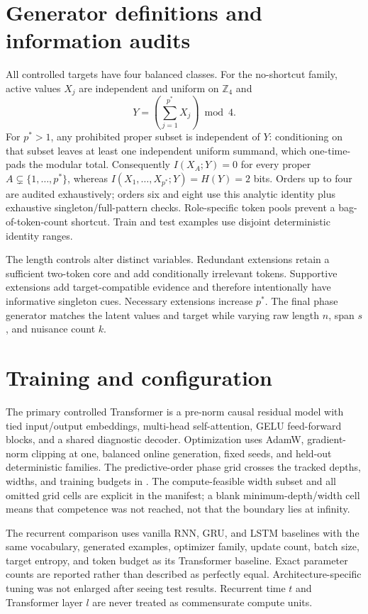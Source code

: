 \section{Generator definitions and information audits}
All controlled targets have four balanced classes.  For the no-shortcut family, active values $X_j$ are independent and uniform on $\mathbb Z_4$ and
\[
Y=\left(\sum_{j=1}^{p^*}X_j\right)\bmod 4.
\]
For $p^*>1$, any prohibited proper subset is independent of $Y$: conditioning on that subset leaves at least one independent uniform summand, which one-time-pads the modular total.  Consequently $I(X_A;Y)=0$ for every proper $A\subsetneq\{1,\ldots,p^*\}$, whereas $I(X_1,\ldots,X_{p^*};Y)=H(Y)=2$ bits.  Orders up to four are audited exhaustively; orders six and eight use this analytic identity plus exhaustive singleton/full-pattern checks.  Role-specific token pools prevent a bag-of-token-count shortcut.  Train and test examples use disjoint deterministic identity ranges.

The length controls alter distinct variables.  Redundant extensions retain a sufficient two-token core and add conditionally irrelevant tokens.  Supportive extensions add target-compatible evidence and therefore intentionally have informative singleton cues.  Necessary extensions increase $p^*$.  The final phase generator matches the latent values and target while varying raw length $n$, span $s$, and nuisance count $k$.

\section{Training and configuration}
\begingroup\raggedright
The primary controlled Transformer is a pre-norm causal residual model with tied input/output embeddings, multi-head self-attention, GELU feed-forward blocks, and a shared diagnostic decoder. Optimization uses AdamW, gradient-norm clipping at one, balanced online generation, fixed seeds, and held-out deterministic families. The predictive-order phase grid crosses the tracked depths, widths, and training budgets in . The compute-feasible width subset and all omitted grid cells are explicit in the manifest; a blank minimum-depth/width cell means that competence was not reached, not that the boundary lies at infinity.\par
\endgroup

The recurrent comparison uses vanilla RNN, GRU, and LSTM baselines with the same vocabulary, generated examples, optimizer family, update count, batch size, target entropy, and token budget as its Transformer baseline. Exact parameter counts are reported rather than described as perfectly equal. Architecture-specific tuning was not enlarged after seeing test results. Recurrent time $t$ and Transformer layer $l$ are never treated as commensurate compute units.

